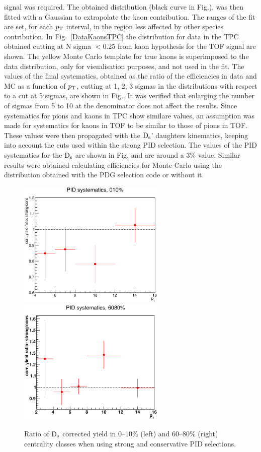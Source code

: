 signal was required. The obtained distribution (black curve in Fig.), was then fitted with a Gaussian to extrapolate the
kaon contribution. The ranges of the fit are set, for each $p_{\rm T}$ interval, in the region less affected by other species contribution.
In Fig.~\ref{DataKaonsTPC} the distribution for data in the TPC obtained cutting at N sigma $< 0.25$ from kaon hypothesis 
for the TOF signal are shown. The yellow Monte Carlo template for true kaons is superimposed to the data distribution, 
only for visualisation purposes, and not used in the fit. The values of the final systematics, obtained as the ratio
of the efficiencies in data and MC as a function of $p_{\rm T}$, cutting at 1, 2, 3 sigmas in the distributions with respect to a
cut at 5 sigmas, are shown in Fig.. 
It was verified that enlarging the number of sigmas from 5 to 10 at the denominator does not affect the results.
Since systematics for pions and kaons in TPC show similare values, an assumption was made for
systematics for kaons in TOF to be similar to those of pions in TOF. These values were then propagated 
with the ${\rm D_s}$' daughters kinematics, keeping into account the cuts used within the strong PID selection.
 The values of the PID systematics for the ${\rm D_s}$ are shown in Fig. and are around a 3\% value.
 Similar results were obtained calculating efficiencies for Monte Carlo using the distribution obtained with
 the PDG selection code or without it.
\begin{figure}[!h]
 \centering
 \includegraphics[angle=0, width=7cm]{./FigCap5/PIDsyst_010.eps}
 \includegraphics[angle=0, width=7cm]{./FigCap5/PIDsyst_6080.eps}
 \caption{Ratio of ${\rm D_s}$ corrected yield in 0--10\% (left) and 60--80\% (right) centrality classes when using strong and conservative PID selections.}
 \label{fig:DsPID0106080} 
\end{figure}

